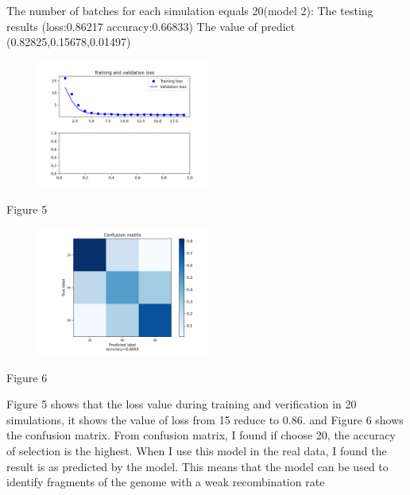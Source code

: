 \documentclass[11pt,a4 paper,title page]{article}
\begin{document}
The number of batches for each simulation equals 20(model 2):
\hfill\break 
The testing results (loss:0.86217 accuracy:0.66833)
\hfill\break 
The value of predict (0.82825,0.15678,0.01497)
\begin{figure}[H]
\centering
\includegraphics[width=0.5\textwidth,angle=360]{../picture/figure5.png}
\end{figure}
\centerline{Figure 5}
\hfill\break 
\begin{figure}[H]
\centering
\includegraphics[width=0.5\textwidth,angle=360]{../picture/figure6.png}
\end{figure}
\centerline{Figure 6}
\hfill\break 
Figure 5 shows that the loss value during training and verification in 20 simulations, it shows the value of loss from 15 reduce to 0.86. and Figure 6 shows the confusion matrix. From confusion matrix, I found if choose 20, the accuracy of selection is the highest. When I use this model in the real data, I found the result is as predicted by the model. This means that the model can be used to identify fragments of the genome with a weak recombination rate
\hfill\break 
\end{document}
